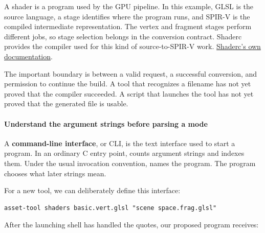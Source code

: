 A shader is a program used by the GPU pipeline. In this example, GLSL is the source language, a stage identifies where the program runs, and SPIR-V is the compiled intermediate representation. The vertex and fragment stages perform different jobs, so stage selection belongs in the conversion contract. Shaderc provides the  compiler used for this kind of source-to-SPIR-V work. \href{https://github.com/google/shaderc}{Shaderc's own documentation}.


The important boundary is between a valid request, a successful conversion, and permission to continue the build. A tool that recognizes a filename has not yet proved that the compiler succeeded. A script that launches the tool has not yet proved that the generated file is usable.

\paragraph{Understand the argument strings before parsing a mode}\label{05-engine-i-ch013-understand-the-argument-strings-before-parsing-a-mode}

\hypertarget{05-engine-i-ch013-understand-the-argument-strings-before-parsing-a-mode}{}

A \textbf{command-line interface}, or CLI, is the text interface used to start a program. In an ordinary C entry point,  counts argument strings and  indexes them. Under the usual invocation convention,  names the program. The program chooses what later strings mean.

For a new tool, we can deliberately define this interface:

\begin{verbatim}
asset-tool shaders basic.vert.glsl "scene space.frag.glsl"
\end{verbatim}

After the launching shell has handled the quotes, our proposed program receives:

